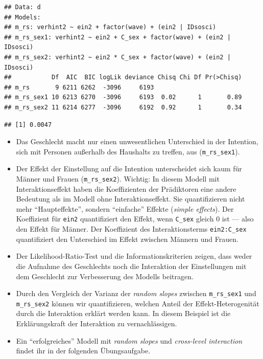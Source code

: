 \documentclass[
]{book}
\newenvironment{Shaded}{\begin{snugshade}}{\end{snugshade}}
\newcommand{\CommentTok}[1]{\textcolor[rgb]{0.56,0.35,0.01}{\textit{#1}}}
\newcommand{\DecValTok}[1]{\textcolor[rgb]{0.00,0.00,0.81}{#1}}
\newcommand{\KeywordTok}[1]{\textcolor[rgb]{0.13,0.29,0.53}{\textbf{#1}}}
\newcommand{\NormalTok}[1]{#1}
\newcommand{\OperatorTok}[1]{\textcolor[rgb]{0.81,0.36,0.00}{\textbf{#1}}}
\newcommand{\StringTok}[1]{\textcolor[rgb]{0.31,0.60,0.02}{#1}}
\providecommand{\tightlist}{%
  \setlength{\itemsep}{0pt}\setlength{\parskip}{0pt}}
\begin{document}
\begin{verbatim}
## Data: d
## Models:
## m_rs: verhint2 ~ ein2 + factor(wave) + (ein2 | IDsosci)
## m_rs_sex1: verhint2 ~ ein2 + C_sex + factor(wave) + (ein2 | IDsosci)
## m_rs_sex2: verhint2 ~ ein2 * C_sex + factor(wave) + (ein2 | IDsosci)
##           Df  AIC  BIC logLik deviance Chisq Chi Df Pr(>Chisq)
## m_rs       9 6211 6262  -3096     6193                        
## m_rs_sex1 10 6213 6270  -3096     6193  0.02      1       0.89
## m_rs_sex2 11 6214 6277  -3096     6192  0.92      1       0.34
\end{verbatim}

\begin{Shaded}
\end{Shaded}

\begin{verbatim}
## [1] 0.0047
\end{verbatim}

\begin{itemize}
\tightlist
\item
  Das Geschlecht macht nur einen unwesentlichen Unterschied in der Intention, sich mit Personen außerhalb des Haushalts zu treffen, aus (\texttt{m\_rs\_sex1}).
\item
  Der Effekt der Einstellung auf die Intention unterscheidet sich kaum für Männer und Frauen (\texttt{m\_rs\_sex2}). Wichtig: In diesem Modell mit Interaktionseffekt haben die Koeffizienten der Prädiktoren eine andere Bedeutung als im Modell ohne Interaktionseffekt. Sie quantifizieren nicht mehr ``Haupteffekte'', sondern ``einfache'' Effekte (\emph{simple effects}). Der Koeffizient für \texttt{ein2} quantifiziert den Effekt, wenn \texttt{C\_sex} gleich 0 ist --- also den Effekt für Männer. Der Koeffizient des Interaktionsterms \texttt{ein2:C\_sex} quantifiziert den Unterschied im Effekt zwischen Männern und Frauen.
\item
  Der Likelihood-Ratio-Test und die Informationskriterien zeigen, dass weder die Aufnahme des Geschlechts noch die Interaktion der Einstellungen mit dem Geschlecht zur Verbesserung des Modells beitragen.
\item
  Durch den Vergleich der Varianz der \emph{random slopes} zwischen \texttt{m\_rs\_sex1} und \texttt{m\_rs\_sex2} können wir quantifizieren, welchen Anteil der Effekt-Heterogenität durch die Interaktion erklärt werden kann. In diesem Beispiel ist die Erklärungskraft der Interaktion zu vernachlässigen.
\item
  Ein ``erfolgreiches'' Modell mit \emph{random slopes} und \emph{cross-level interaction} findet ihr in der folgenden Übungsaufgabe.
\end{itemize}
\end{document}
